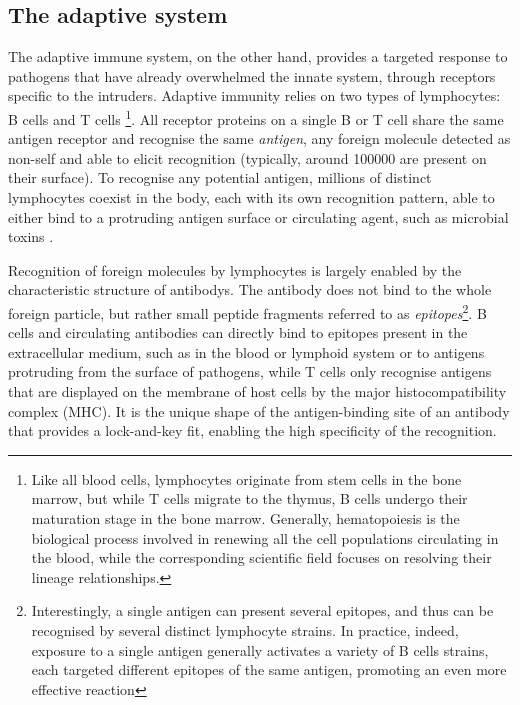 \subsection{The adaptive system}
\label{subsec:adaptive-system}
The adaptive immune system, on the other hand, provides a targeted response to pathogens that have already overwhelmed the innate system, through receptors specific to the intruders. Adaptive immunity relies on two types of lymphocytes: B cells and T cells \footnote{Like all blood cells, lymphocytes originate from stem cells in the bone marrow, but while T cells migrate to the thymus, B cells undergo their maturation stage in the bone marrow. Generally, \Gls{hematopoiesis} is the biological process involved in renewing all the cell populations circulating in the blood, while the corresponding scientific field focuses on resolving their lineage relationships.}. 
All receptor proteins on a single B or T cell share the same antigen receptor and recognise the same \textit{antigen}, any foreign molecule detected as non-self and able to elicit recognition (typically, around \num{100000} are present on their surface). To recognise any potential antigen, millions of distinct lymphocytes coexist in the body, each with its own recognition pattern, able to either bind to a protruding antigen surface or circulating agent, such as microbial toxins . 

Recognition of foreign molecules by lymphocytes is largely enabled by the characteristic structure of \glspl{antibody}. The antibody does not bind to the whole foreign particle, but rather small peptide fragments referred to as \textit{epitopes}\footnote{Interestingly, a single antigen can present several epitopes, and thus can be recognised by several distinct lymphocyte strains. In practice, indeed, exposure
to a single antigen generally activates a variety of B cells strains, each targeted different epitopes of the same antigen, promoting an even more effective reaction}. B cells and circulating antibodies can directly bind to epitopes present in the extracellular medium, such as in the blood or lymphoid system or to antigens protruding from the surface of pathogens, while T cells only recognise antigens that are displayed on the membrane of host cells by the major histocompatibility complex (MHC). It is the unique shape of the antigen-binding site of an antibody that provides a lock-and-key fit, enabling the high specificity of the recognition.



